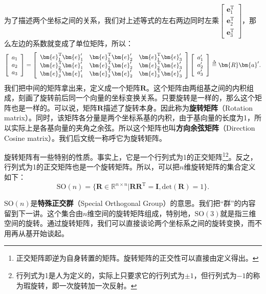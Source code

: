 为了描述两个坐标之间的关系，我们对上述等式的左右两边同时左乘$\left[ \begin{array}{l}
\bm{e}_1^\mathrm{T}\\
\bm{e}_2^\mathrm{T}\\
\bm{e}_3^\mathrm{T}
\end{array} \right]$，那么左边的系数就变成了单位矩阵，所以：
\begin{equation}
\left[ \begin{array}{l}
{a_1}\\
{a_2}\\
{a_3}
\end{array} \right] = \left[ {\begin{array}{*{20}{c}}
	{\bm{e}_1^\mathrm{T}\bm{e}_1'} & {\bm{e}_1^\mathrm{T}\bm{e}_2'} & {\bm{e}_1^\mathrm{T}\bm{e}_3'}\\
	{\bm{e}_2^\mathrm{T}\bm{e}_1'} & {\bm{e}_2^\mathrm{T}\bm{e}_2'} & {\bm{e}_2^\mathrm{T}\bm{e}_3'}\\
	{\bm{e}_3^\mathrm{T}\bm{e}_1'} & {\bm{e}_3^\mathrm{T}\bm{e}_2'} & {\bm{e}_3^\mathrm{T}\bm{e}_3'}
	\end{array}} \right]\left[ \begin{array}{l}
a_1'\\
a_2'\\
a_3'
\end{array} \right] \buildrel \Delta \over = \bm{R} \bm{a}'.
\end{equation}
我们把中间的矩阵拿出来，定义成一个矩阵$\bm{R}$。这个矩阵由两组基之间的内积组成，刻画了旋转前后同一个向量的坐标变换关系。只要旋转是一样的，那么这个矩阵也是一样的。可以说，矩阵$\bm{R}$描述了旋转本身。因此称为\textbf{旋转矩阵}（Rotation matrix）。同时，该矩阵各分量是两个坐标系基的内积，由于基向量的长度为1，所以实际上是各基向量的夹角之余弦。所以这个矩阵也叫\textbf{方向余弦矩阵}（Direction Cosine matrix）。我们后文统一称呼它为旋转矩阵。

旋转矩阵有一些特别的性质。事实上，它是一个行列式为1的正交矩阵\footnote{正交矩阵即逆为自身转置的矩阵。旋转矩阵的正交性可以直接由定义得出。}\footnote{行列式为1是人为定义的，实际上只要求它的行列式为$\pm 1$，但行列式为$-1$的称为瑕旋转，即一次旋转加一次反射。}。反之，行列式为1的正交矩阵也是一个旋转矩阵。所以，可以把$n$维旋转矩阵的集合定义如下：
\begin{equation}
\mathrm{SO}(n) = \{ \bm{R} \in \mathbb{R}^{n \times n} | \bm{R R}^\mathrm{T} = \bm{I}, \mathrm{det} (\bm{R})=1 \}.
\end{equation}

$\mathrm{SO}(n)$是\textbf{特殊正交群}（Special Orthogonal Group）的意思。我们把“群”的内容留到下一讲。这个集合由$n$维空间的旋转矩阵组成，特别地，$\mathrm{SO}(3)$就是指三维空间的旋转。通过旋转矩阵，我们可以直接谈论两个坐标系之间的旋转变换，而不用再从基开始谈起。

